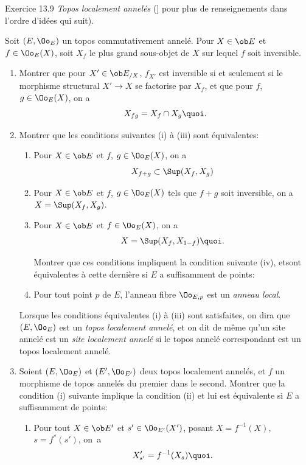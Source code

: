 \begin{enonce*}[remark]{Exercice 13.9}
\emph{Topos localement annelés} (\cf [\hyperref[IV.sec9]{9}] pour plus de
renseignements dans l'ordre d'idées qui suit).

Soit $(E,{\Oo}_E)$ un topos commutativement annelé. Pour $X\in
\ob E$ et $f\in {\Oo}_E(X)$, soit $X_f$ le plus grand sous-objet
de $X$ sur lequel $f$ soit inversible.
\begin{enumerate}
\renewcommand{\theenumi}{\alph{enumi}}
\renewcommand{\labelenumi}{\theenumi)}
\item Montrer que pour $X'\in \ob E_{/X}$, $f_{X'}$ est inversible si
et seulement si le morphisme structural $X'\rightarrow X$ se
factorise par $X_f$, et que pour $f$, $g\in {\Oo}_E(X)$, on a
$$
X_{fg}=X_f\cap X_g{\quoi}.
$$

\item Montrer que les conditions suivantes (i) à (iii) sont
équivalentes:
\begin{enumerate}
\renewcommand{\theenumii}{\roman{enumii}}
\renewcommand{\labelenumii}{(\theenumii)}
\item Pour $X\in \ob E$ et $f$, $g\in {\Oo}_E(X)$, on a
$$
X_{f+g}\subset \Sup(X_f,X_g)
$$

\item Pour $X\in \ob E$ et $f$, $g\in {\Oo}_E(X)$ tels que $f+g$ soit
inversible, on a $X=\Sup(X_f,X_g)$.

\item Pour $X\in \ob E$ et $f\in {\Oo}_E(X)$, on a
$$
X=\Sup(X_f, X_{1-f}){\quoi}.
$$

Montrer que ces conditions impliquent la condition suivante (iv),
et\pageoriginale sont équivalentes à cette dernière si $E$ a
suffisamment de points:

\item Pour tout point $p$ de $E$, l'anneau fibre ${\Oo}_{E,p}$ est un
\emph{anneau local}.
\end{enumerate}

Lorsque les conditions équivalentes (i) à (iii) sont satisfaites, on
dira que $(E,{\Oo}_E)$ est un \emph{topos localement annelé}, et
on dit de même qu'un site annelé est un \emph{site localement
annelé} si le topos annelé correspondant est un topos localement
annelé.

\item Soient $(E,{\Oo}_E)$ et $(E',{\Oo}_{E'})$ deux topos localement
annelés, et $f$ un morphisme de topos annelés du premier dans le
second. Montrer que la condition (i) suivante implique la condition
(ii) et lui est équivalente si $E$ a suffisamment de points:
\begin{enumerate}
\renewcommand{\theenumii}{\roman{enumii}}
\renewcommand{\labelenumii}{(\theenumii)}
\item Pour tout $X\in \ob E'$ et $s'\in {\Oo}_{E'}(X')$, posant
$X=f^{-1}(X)$, $s=f^{\ast}(s')$, on~a
$$
X'_{s'}=f^{-1}(X_s){\quoi}.
$$


\end{enumerate}
\end{enumerate}
\end{enonce*}
